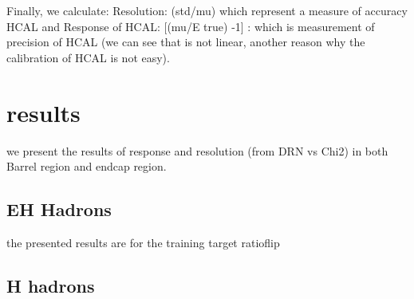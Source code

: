 Finally, we calculate: Resolution: (std/mu) which represent a measure of accuracy HCAL 
and Response of HCAL:  [(mu/E true) -1] : which is measurement of precision of HCAL 
(we can see that is not linear, another reason why the calibration of HCAL is not easy).

\section{results}
we present the results of response and resolution (from DRN vs Chi2) in  both Barrel region and endcap region.

\subsection{EH Hadrons}
the presented results are for the training target ratioflip





\subsection{H hadrons}




